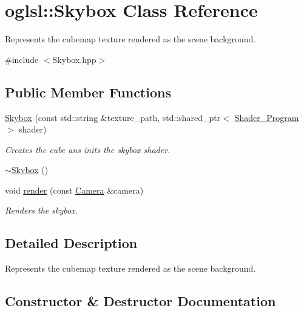 \hypertarget{classoglsl_1_1_skybox}{}\section{oglsl\+:\+:Skybox Class Reference}
\label{classoglsl_1_1_skybox}


Represents the cubemap texture rendered as the scene background.  




{\ttfamily \#include $<$Skybox.\+hpp$>$}

\subsection*{Public Member Functions}
\begin{DoxyCompactItemize}
\item 
\mbox{\hyperlink{classoglsl_1_1_skybox_a1fd7b807be900efc97e0e1ab2f0e0d1b}{Skybox}} (const std\+::string \&texture\+\_\+path, std\+::shared\+\_\+ptr$<$ \mbox{\hyperlink{classoglsl_1_1_shader___program}{Shader\+\_\+\+Program}} $>$ shader)
\begin{DoxyCompactList}\small\item\em Creates the cube ans inits the skybox shader. \end{DoxyCompactList}\item 
\mbox{\hyperlink{classoglsl_1_1_skybox_ae49b37d4211f0f6f3fb7de0199324a3f}{$\sim$\+Skybox}} ()
\item 
void \mbox{\hyperlink{classoglsl_1_1_skybox_a2ee558805867f1acdfab64f689c41f76}{render}} (const \mbox{\hyperlink{classoglsl_1_1_camera}{Camera}} \&camera)
\begin{DoxyCompactList}\small\item\em Renders the skybox. \end{DoxyCompactList}\end{DoxyCompactItemize}


\subsection{Detailed Description}
Represents the cubemap texture rendered as the scene background. 

\subsection{Constructor \& Destructor Documentation}
\mbox{\label{classoglsl_1_1_skybox_a1fd7b807be900efc97e0e1ab2f0e0d1b}} 

